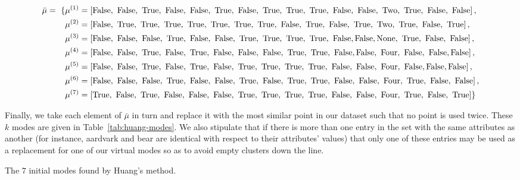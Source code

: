 \begin{example}
    \begin{equation}
    \nonumber
    \begin{aligned}
        \bar{\mu} = \ \{ & \mu^{(1)} = \left[\false, \ \false, \ \true, \ 
        \false, \ \false, \ \true, \ \false, \ \true, \ \true, \ \true, \ 
        \false, \ \false, \ \text{Two}, \ \true, \ \false, \ \false\right],
        \\
        {} & \mu^{(2)} = \left[\false, \ \true, \ \true, \ \true, \ \true, \
        \true, \ \true, \ \true, \ \false, \ \true, \ \false, \ \true, \
        \text{Two}, \ \true, \ \false, \ \true\right],
        \\
        {} & \mu^{(3)} = \left[\false, \ \false, \ \false, \ \true, \ \false, \
        \false, \ \true, \ \true, \ \true, \ \true, \ \false, \false, 
        \text{None}, \ \true, \ \false, \ \false\right],
        \\
        {} & \mu^{(4)} = \left[\false, \ \false, \ \true, \ \false, \ \true, \
        \false, \ \false, \ \false, \ \true, \ \true, \ \false, \false, \
        \text{Four}, \ \false, \ \false, \false\right],
        \\
        {} & \mu^{(5)} = \left[\false, \ \false, \ \true, \ \false, \ \true, \
        \false, \ \true, \ \true, \ \true, \ \true, \ \false, \ \false, \
        \text{Four}, \ \false, \false, \false\right],
        \\
        {} & \mu^{(6)} = \left[\false, \ \false, \ \false, \ \true, \ \false, \
        \false, \ \true, \ \false, \ \true, \ \true, \ \false, \ \false, \
        \text{Four}, \ \true, \ \false, \ \false\right],
        \\
        {} & \mu^{(7)} = \left[\true, \ \false, \ \true, \ \false, \ \false, \
        \false, \ \true, \ \true, \ \true, \ \true, \ \false, \ \false, \ 
        \text{Four}, \ \true, \ \false, \ \true\right]\}
    \end{aligned}
    \end{equation}

    Finally, we take each element of \(\bar{\mu}\) in turn and replace it with
    the most similar point in our dataset such that no point is used twice.
    These \(k\) modes are given in Table~\ref{tab:huang-modes}.
    We also stipulate that if there is more than one entry in the set with the 
    same attributes as another (for instance, aardvark and bear are identical
    with respect to their attributes' values) that only one of these entries may
    be used as a replacement for one of our virtual modes so as to avoid empty
    clusters down the line.\\

    \begin{table}[h]
    \resizebox{\textwidth}{!}{%
        
    }
    \caption{The \(7\) initial modes found by Huang's
    method.}\label{tab:huang-modes}
    \end{table}
\end{example}

